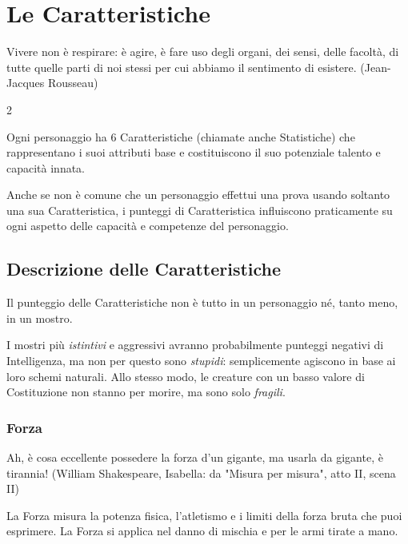 \section{Le Caratteristiche}

\begin{enfasi}{
Vivere non è respirare: è agire, è fare uso degli organi, dei sensi, delle facoltà, di tutte quelle parti di noi stessi per cui abbiamo il sentimento di esistere. (Jean-Jacques Rousseau)
}\end{enfasi}

\begin{multicols}{2}

Ogni personaggio ha 6 Caratteristiche (chiamate anche Statistiche) che rappresentano i suoi attributi base e costituiscono il suo potenziale talento e capacità innata.

Anche se non è comune che un personaggio effettui una prova usando soltanto una sua Caratteristica, i punteggi di Caratteristica influiscono praticamente su ogni aspetto delle capacità e competenze del personaggio.

\subsection{Descrizione delle Caratteristiche}\label{decrizionedellecaratteristiche}

Il punteggio delle Caratteristiche non è tutto in un personaggio né, tanto meno, in un mostro.

I mostri più \emph{istintivi} e aggressivi avranno probabilmente punteggi negativi di Intelligenza, ma non per questo sono \emph{stupidi}: semplicemente agiscono in base ai loro schemi naturali. Allo stesso modo, le creature con un basso valore di Costituzione non stanno per morire, ma sono solo \emph{fragili}.

\subsubsection{Forza}\label{forza}

\begin{enfasi}{
Ah, è cosa eccellente possedere la forza d'un gigante, ma usarla da gigante, è tirannia! (William Shakespeare, Isabella: da "Misura per misura", atto II, scena II)
}\end{enfasi}

La Forza misura la potenza fisica, l'atletismo e i limiti della forza bruta che puoi esprimere. La Forza si applica nel danno di mischia e per le armi tirate a mano.


\end{multicols}
